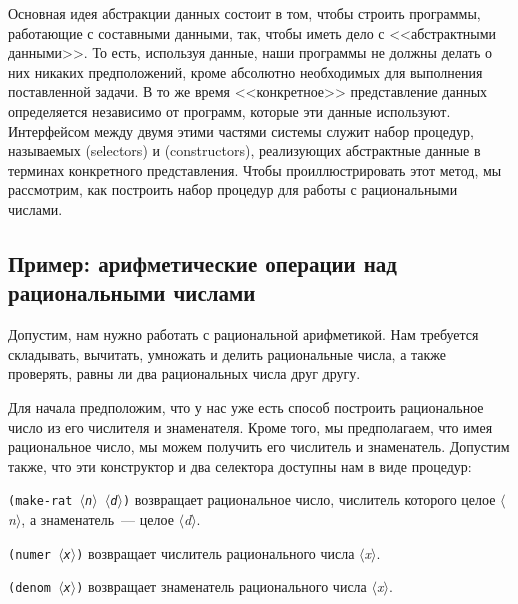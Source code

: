 Основная идея абстракции данных состоит в том, чтобы строить
программы, работающие с составными данными, так, чтобы
иметь дело с <<абстрактными данными>>. То есть, используя данные, наши
программы не должны делать о них никаких
предположений, кроме абсолютно необходимых для
выполнения поставленной задачи.  В то же время  
<<конкретное>>
представление данных определяется независимо от программ, которые эти
данные используют.  Интерфейсом между двумя этими частями системы
служит набор процедур, называемых  (selectors) 
и  (constructors), реализующих
абстрактные данные в терминах конкретного представления.  Чтобы
проиллюстрировать этот метод, мы рассмотрим, как построить набор
процедур для работы с рациональными числами.

\subsection{Пример: арифметические операции над рациональными числами}
\label{EXMP-ARITH-OPER-FOR-RAT-NUMBERS}


Допустим, нам нужно работать с 
рациональной арифметикой.  
Нам требуется складывать, вычитать, умножать и делить рациональные
числа, а также проверять, равны ли два рациональных числа друг
другу.

Для начала предположим, что у нас уже есть способ построить 
рациональное число из его числителя и знаменателя.  Кроме того, мы
предполагаем, что имея рациональное число, мы можем получить его
числитель и знаменатель.  Допустим также, что эти конструктор и два
селектора доступны нам в виде процедур:

\begin{plainlist}

\item
{\tt (make-rat {\it $\langle$n$\rangle$}
{\it $\langle$d$\rangle$})} 
возвращает рациональное число, числитель
которого целое {\it $\langle$n$\rangle$}, а знаменатель~--- целое {\it $\langle$d$\rangle$}.

\item
{\tt (numer {\it $\langle$x$\rangle$})} 
возвращает числитель рационального числа {\it $\langle$x$\rangle$}.

\item
{\tt (denom {\it $\langle$x$\rangle$})}
возвращает знаменатель рационального числа {\it $\langle$x$\rangle$}.
\end{plainlist}

